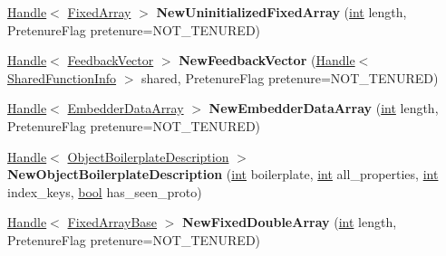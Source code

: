 \begin{DoxyCompactItemize}
\mbox{\hyperlink{classv8_1_1internal_1_1Handle}{Handle}}$<$ \mbox{\hyperlink{classv8_1_1internal_1_1FixedArray}{Fixed\+Array}} $>$ {\bfseries New\+Uninitialized\+Fixed\+Array} (\mbox{\hyperlink{classint}{int}} length, Pretenure\+Flag pretenure=N\+O\+T\+\_\+\+T\+E\+N\+U\+R\+ED)
\item 
\mbox{\label{classv8_1_1internal_1_1Factory_a2e97d9e89cd56a8dd8ac936c76768de2}} 
\mbox{\hyperlink{classv8_1_1internal_1_1Handle}{Handle}}$<$ \mbox{\hyperlink{classv8_1_1internal_1_1FeedbackVector}{Feedback\+Vector}} $>$ {\bfseries New\+Feedback\+Vector} (\mbox{\hyperlink{classv8_1_1internal_1_1Handle}{Handle}}$<$ \mbox{\hyperlink{classv8_1_1internal_1_1SharedFunctionInfo}{Shared\+Function\+Info}} $>$ shared, Pretenure\+Flag pretenure=N\+O\+T\+\_\+\+T\+E\+N\+U\+R\+ED)
\item 
\mbox{\label{classv8_1_1internal_1_1Factory_aa9a815cf90c94d03260ab08b947b91c9}} 
\mbox{\hyperlink{classv8_1_1internal_1_1Handle}{Handle}}$<$ \mbox{\hyperlink{classv8_1_1internal_1_1EmbedderDataArray}{Embedder\+Data\+Array}} $>$ {\bfseries New\+Embedder\+Data\+Array} (\mbox{\hyperlink{classint}{int}} length, Pretenure\+Flag pretenure=N\+O\+T\+\_\+\+T\+E\+N\+U\+R\+ED)
\item 
\mbox{\label{classv8_1_1internal_1_1Factory_a7ef7c5b3ed81d5f395a36ff89058c76e}} 
\mbox{\hyperlink{classv8_1_1internal_1_1Handle}{Handle}}$<$ \mbox{\hyperlink{classv8_1_1internal_1_1ObjectBoilerplateDescription}{Object\+Boilerplate\+Description}} $>$ {\bfseries New\+Object\+Boilerplate\+Description} (\mbox{\hyperlink{classint}{int}} boilerplate, \mbox{\hyperlink{classint}{int}} all\+\_\+properties, \mbox{\hyperlink{classint}{int}} index\+\_\+keys, \mbox{\hyperlink{classbool}{bool}} has\+\_\+seen\+\_\+proto)
\item 
\mbox{\label{classv8_1_1internal_1_1Factory_a4a0dbca8e29ef8e44d9b4d759ad714ba}} 
\mbox{\hyperlink{classv8_1_1internal_1_1Handle}{Handle}}$<$ \mbox{\hyperlink{classv8_1_1internal_1_1FixedArrayBase}{Fixed\+Array\+Base}} $>$ {\bfseries New\+Fixed\+Double\+Array} (\mbox{\hyperlink{classint}{int}} length, Pretenure\+Flag pretenure=N\+O\+T\+\_\+\+T\+E\+N\+U\+R\+ED)
\item 
\mbox{\label{classv8_1_1internal_1_1Factory_aedd059961170135791a38d126ec4f8fd}} 

\end{DoxyCompactItemize}
